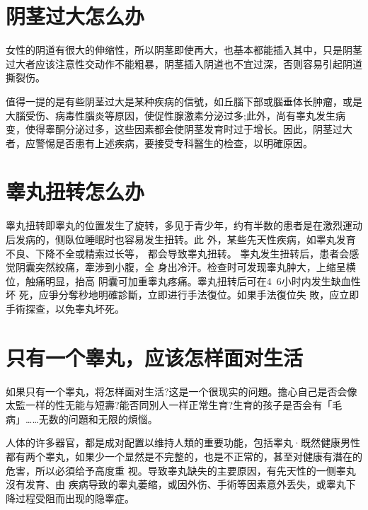 \documentclass[12pt,UTF8]{ctexbook}
\begin{document}
\section{阴茎过大怎么办}

女性的阴道有很大的伸缩性，所以阴茎即使再大，也基本都能插入其中，只是阴茎过大者应该注意性交动作不能粗暴，阴茎插入阴道也不宜过深，否则容易引起阴道撕裂伤。

值得一提的是有些阴茎过大是某种疾病的信號，如丘腦下部或腦垂体长肿瘤，或是大腦受伤、病毒性腦炎等原因，使促性腺激素分泌过多;此外，尚有睾丸发生病变，使得睾酮分泌过多，这些因素都会使阴茎发育时过于增长。因此，阴茎过大者，应警惕是否患有上述疾病，要接受专科醫生的检查，以明確原因。

\section{睾丸扭转怎么办}

睾丸扭转即睾丸的位置发生了旋转，多见于青少年，约有半数的患者是在激烈運动后发病的，侧臥位睡眠时也容易发生扭转。此
外，某些先天性疾病，如睾丸发育不良、下降不全或精索过长等，
都会导致睾丸扭转。
睾丸发生扭转后，患者会感觉阴囊突然絞痛，牽涉到小腹，全
身出冷汗。检查时可发现睾丸肿大，上缩呈横位，触痛明显，抬高
阴囊可加重睾丸疼痛。睾丸扭转后可在4~6小时内发生缺血性坏
死，应爭分奪秒地明確診斷，立即进行手法復位。如果手法復位失
敗，应立即手術探查，以免睾丸坏死。

\section{只有一个睾丸，应该怎样面对生活}

如果只有一个睾丸，将怎样面对生活?这是一个很现实的问題。擔心自己是否会像太監一样的性无能与短壽?能否同別人一样正常生育?生育的孩子是否会有「毛病」……无数的问題和无限的煩惱。

人体的许多器官，都是成对配置以维持人類的重要功能，包括睾丸·既然健康男性都有两个睾丸，如果少一个显然是不完整的，也是不正常的，甚至对健康有潛在的危害，所以必須给予高度重
视。导致睾丸缺失的主要原因，有先天性的一侧睾丸沒有发育、由
疾病导致的睾丸萎缩，或因外伤、手術等因素意外丢失，或睾丸下
降过程受阻而出现的隐睾症。
\end{document}
